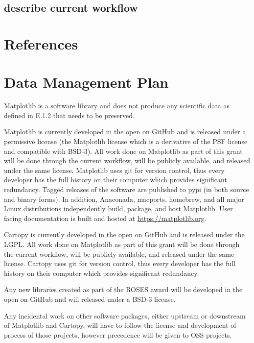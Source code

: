 \documentclass[12pt]{article}
\numberwithin{page}{section}
\begin{document}
\subsection{describe current workflow}

\newpage
\section{References}
\setcounter{page}{1}


\newpage
\section{Data Management Plan}
\setcounter{page}{1}

Matplotlib is a software library and does not produce any scientific
data as defined in E.1.2 that needs to be preserved.

Matplotlib is currently developed in the open on GitHub and is
released under a permissive license (the Matplotlib license which is a
derivative of the PSF license and compatible with BSD-3).  All work
done on Matplotlib as part of this grant will be done through the
current workflow, will be publicly available, and released under the
same license.  Matplotlib uses git for version control, thus every
developer has the full history on their computer which provides
significant redundancy.  Tagged releases of the software are published
to pypi (in both source and binary forms).  In addition, Anaconada,
macports, homebrew, and all major Linux distributions independently
build, package, and host Matplotlib.  User facing documentation is built
and hosted at \url{https://matplotlib.org}.

Cartopy is currently developed in the open on GitHub and is released
under the LGPL.  All work done on Matplotlib as part of this grant
will be done through the current workflow, will be publicly available,
and released under the same license. Cartopy uses git for version
control, thus every developer has the full history on their computer
which provides significant redundancy.


Any new libraries created as part of the ROSES award will be developed
in the open on GitHub and will released under a BSD-3 license.

Any incidental work on other software packages, either upstream or
downstream of Matplotlib and Cartopy, will have to follow the license
and development of process of those projects, however precedence will
be given to OSS projects.
\end{document}
